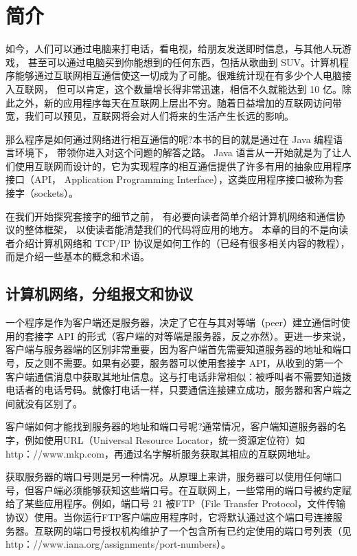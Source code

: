 
\chapter{简介}

	如今，人们可以通过电脑来打电话，看电视，给朋友发送即时信息，与其他人玩游戏， 甚至可以通过电脑买到你能想到的任何东西，包括从歌曲到 SUV。计算机程序能够通过互联网相互通信使这一切成为了可能。很难统计现在有多少个人电脑接入互联网， 但可以肯定，这个数量增长得非常迅速，相信不久就能达到 10 亿。除此之外，新的应用程序每天在互联网上层出不穷。随着日益增加的互联网访问带宽，我们可以预见，互联网将会对人们将来的生活产生长远的影响。

	那么程序是如何通过网络进行相互通信的呢?本书的目的就是通过在 Java 编程语言环境下， 带领你进入对这个问题的解答之路。 Java 语言从一开始就是为了让人们使用互联网而设计的，它为实现程序的相互通信提供了许多有用的抽象应用程序接口（API， Application Programming Interface），这类应用程序接口被称为套接字（sockets）。

	在我们开始探究套接字的细节之前， 有必要向读者简单介绍计算机网络和通信协议的整体框架， 以使读者能清楚我们的代码将应用的地方。 本章的目的不是向读者介绍计算机网络和 TCP/IP 协议是如何工作的（已经有很多相关内容的教程），而是介绍一些基本的概念和术语。


	\section{计算机网络，分组报文和协议}

		一个程序是作为客户端还是服务器，决定了它在与其对等端（peer）建立通信时使用的套接字 API 的形式（客户端的对等端是服务器，反之亦然）。更进一步来说，客户端与服务器端的区别非常重要，因为客户端首先需要知道服务器的地址和端口号，反之则不需要。如果有必要，服务器可以使用套接字 API，从收到的第一个客户端通信消息中获取其地址信息。这与打电话非常相似：被呼叫者不需要知道拨电话者的电话号码。就像打电话一样，只要通信连接建立成功，服务器和客户端之间就没有区别了。

		客户端如何才能找到服务器的地址和端口号呢?通常情况，客户端知道服务器的名字，例如使用URL（Universal Resource Locator，统一资源定位符）如http：//www.mkp.com，再通过名字解析服务获取其相应的互联网地址。

		获取服务器的端口号则是另一种情况。从原理上来讲，服务器可以使用任何端口号，但客户端必须能够获知这些端口号。在互联网上，一些常用的端口号被约定赋给了某些应用程序。例如，端口号 21 被FTP（File Transfer Protocol，文件传输协议）使用。当你运行FTP客户端应用程序时，它将默认通过这个端口号连接服务器。互联网的端口号授权机构维护了一个包含所有已约定使用的端口号列表（见http：//www.iana.org/assignments/port-numbers）。


